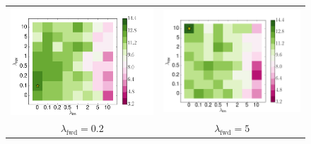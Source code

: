 \documentclass[11pt,a4paper]{article}
\begin{document}
\begin{figure}
\begin{tabular}{c c}
\includegraphics[scale=0.36]{wmt0_1.png} & \includegraphics[scale=0.36]{wmt2.png} \\
$\lambda_\text{fwd} = 0.2$ & $\lambda_\text{fwd} = 5$ \\

\end{tabular}
\end{figure}
\end{document}
